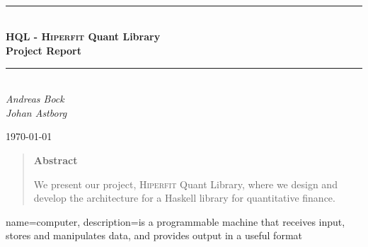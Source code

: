 \documentclass[a4paper,11pt]{scrreprt}
\def\Title{\bf HQL - \textsc{Hiperfit} Quant Library\\ {\Large Project Report}}
\newcommand{\HRule}{\rule{\linewidth}{0.5mm}}
\begin{document}
\begin{titlepage}

\textsc{\LARGE }\\[1.5cm]
\textsc{\Large }\\[0.5cm]
\textsc{\large }\\[0.5cm]
 
\begin{center}
\HRule \\[0.5cm]
\huge \bfseries \Title\\
\HRule \\[0.5cm]

\normalfont 
\Large
\textit{Andreas Bock \\ Johan Astborg }\\[3cm]

\date{\today}

{\today}\\[4cm]
 
\vfill
\end{center}

\end{titlepage}
\begin{abstract}
\begin{center}
\textbf{Abstract}
\end{center}
We present our project, \textsc{Hiperfit} Quant Library, where we design and develop the architecture for a Haskell library for quantitative finance.

\end{abstract}
\tableofcontents
\listoftables
{}
\listoffigures











{
  name=computer,
    description={is a programmable machine that receives input,
                   stores and manipulates data, and provides
                                  output in a useful format}
}
\end{document}
